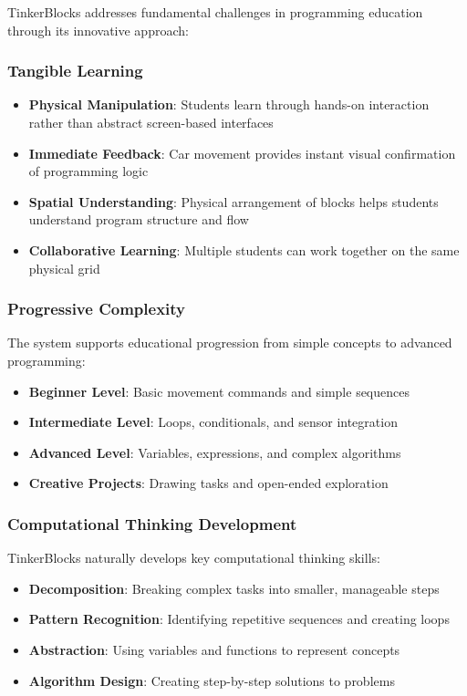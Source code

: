 TinkerBlocks addresses fundamental challenges in programming education through its innovative approach:

\subsubsection{Tangible Learning}
\begin{itemize}
    \item \textbf{Physical Manipulation}: Students learn through hands-on interaction rather than abstract screen-based interfaces
    \item \textbf{Immediate Feedback}: Car movement provides instant visual confirmation of programming logic
    \item \textbf{Spatial Understanding}: Physical arrangement of blocks helps students understand program structure and flow
    \item \textbf{Collaborative Learning}: Multiple students can work together on the same physical grid
\end{itemize}

\subsubsection{Progressive Complexity}
The system supports educational progression from simple concepts to advanced programming:
\begin{itemize}
    \item \textbf{Beginner Level}: Basic movement commands and simple sequences
    \item \textbf{Intermediate Level}: Loops, conditionals, and sensor integration
    \item \textbf{Advanced Level}: Variables, expressions, and complex algorithms
    \item \textbf{Creative Projects}: Drawing tasks and open-ended exploration
\end{itemize}

\subsubsection{Computational Thinking Development}
TinkerBlocks naturally develops key computational thinking skills:
\begin{itemize}
    \item \textbf{Decomposition}: Breaking complex tasks into smaller, manageable steps
    \item \textbf{Pattern Recognition}: Identifying repetitive sequences and creating loops
    \item \textbf{Abstraction}: Using variables and functions to represent concepts
    \item \textbf{Algorithm Design}: Creating step-by-step solutions to problems
\end{itemize}

